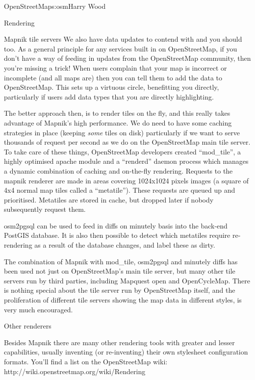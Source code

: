 \begin{aosachapter}{OpenStreetMap}{s:osm}{Harry Wood}
\begin{aosasect1}{Rendering}
\begin{aosasect2}{Mapnik tile servers}
We also have data updates to contend with and you should too. As a
general principle for any services built in on OpenStreetMap, if you
don't have a way of feeding in updates from the OpenStreetMap
community, then you're missing a trick! When users complain that your
map is incorrect or incomplete (and all maps are) then you can tell
them to add the data to OpenStreetMap. This sets up a virtuous circle,
benefitting you directly, particularly if users add data types that
you are directly highlighting.

The better approach then, is to render tiles on the fly, and this
really takes advantage of Mapnik's high performance. We do need to
have some caching strategies in place (keeping \emph{some} tiles on
disk) particularly if we want to serve thousands of request per second
as we do on the OpenStreetMap main tile server. To take care of these
things, OpenStreetMap developers created ``mod\_tile'', a highly
optimised apache module and a ``renderd'' daemon process which manages
a dynamic combination of caching and on-the-fly rendering. Requests to
the mapnik renderer are made in areas covering 1024x1024 pixels images
(a square of 4x4 normal map tiles called a ``metatile''). These
requests are queued up and prioritised. Metatiles are stored in cache,
but dropped later if nobody subsequently request them.

osm2pgsql can be used to feed in diffs on minutely basis into the
back-end PostGIS database. It is also then possible to detect which
metatiles require re-rendering as a result of the database changes,
and label these as dirty.

The combination of Mapnik with mod\_tile, osm2pgsql and minutely diffs
has been used not just on OpenStreetMap's main tile server, but many
other tile servers run by third parties, including Mapquest open and
OpenCycleMap. There is nothing special about the tile server run by
OpenStreetMap itself, and the proliferation of different tile servers
showing the map data in different styles, is very much encouraged.

\end{aosasect2}

\begin{aosasect2}{Other renderers}

Besides Mapnik there are many other rendering tools with greater and
lesser capabilities, usually inventing (or re-inventing) their own
stylesheet configuration formats. You'll find a list on the
OpenStreetMap wiki: http://wiki.openstreetmap.org/wiki/Rendering


\end{aosasect2}
\end{aosasect1}
\end{aosachapter}
